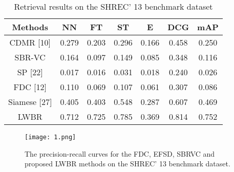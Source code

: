 \documentclass{article}
\begin{document}
\begin{table}[h]
\centering
\begin{tabular}{|c|c|c|c|c|c|c|}
\hline
Methods & NN &FT &ST& E & DCG & mAP\\
\hline
CDMR [10]&0.279&0.203&0.296&0.166&0.458&0.250\\
\hline
SBR-VC&0.164&0.097&0.149&0.085&0.348&0.116\\
\hline
SP [22]&0.017&0.016&0.031&0.018&0.240&0.026\\
\hline
FDC [12]&0.110&0.069&0.107&0.061&0.307&0.086\\
\hline
Siamese [27]&0.405&0.403&0.548&0.287&0.607&0.469\\
\hline
LWBR&0.712&0.725&0.785&0.369&0.814&0.752\\
\hline
\end{tabular}
\caption{Retrieval results on the SHREC' 13 benchmark dataset}
\end{table}  

\begin{figure}[ht]
\centering
\texttt{[image: 1.png]}
\caption{The precision-recall curves for the FDC, EFSD, SBRVC
and proposed LWBR methods on the SHREC' 13 benchmark
dataset.}
\end{figure}


\end{document}

